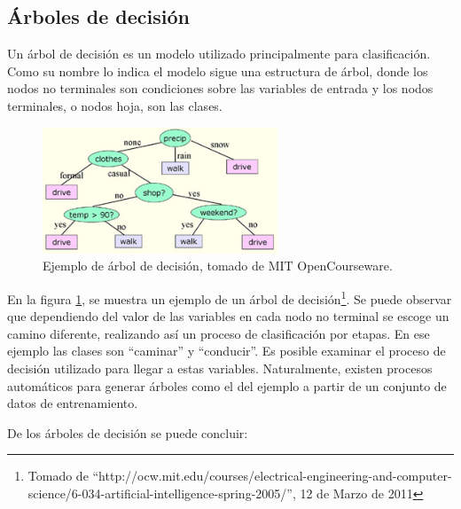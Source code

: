 \documentclass[a4paper, 11pt, oneside]{report}
\begin{document}
\subsection{Árboles de decisión}

Un árbol de decisión es un modelo utilizado principalmente para clasificación. Como su nombre lo indica el modelo sigue una estructura de árbol, donde los nodos no terminales son condiciones sobre las variables de entrada y los nodos terminales, o nodos hoja, son las clases.

	\begin{figure}[htb]
	\begin{center}
	\leavevmode
	\includegraphics[width=7cm]{img/decisiontree.jpg}
	\end{center}
	\caption{Ejemplo de árbol de decisión, tomado de MIT OpenCourseware.}
	\label{fig:decisionTree}
	\end{figure}

En la figura \ref{fig:decisionTree}, se muestra un ejemplo de un árbol de decisión\footnote{Tomado de ``http://ocw.mit.edu/courses/electrical-engineering-and-computer-science/6-034-artificial-intelligence-spring-2005/'', 12 de Marzo de 2011}. Se puede observar que dependiendo del valor de las variables en cada nodo no terminal se escoge un camino diferente, realizando así un proceso de clasificación por etapas. En ese ejemplo las clases son ``caminar'' y ``conducir''. Es posible examinar el proceso de decisión utilizado para llegar a estas variables. Naturalmente, existen procesos automáticos para generar árboles como el del ejemplo a partir de un conjunto de datos de entrenamiento.

De los árboles de decisión se puede concluir:
\end{document}
